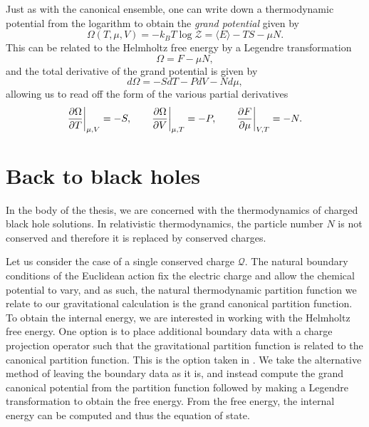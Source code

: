 Just as with the canonical ensemble, one can write down a thermodynamic potential from the logarithm to obtain the \emph{grand potential} given by
\begin{equation*}
	\Omega(T, \mu, V) = - k_B T \log \mathcal{Z} = \langle E \rangle - TS - \mu N.
\end{equation*}
This can be related to the Helmholtz free energy by a Legendre transformation
\begin{equation*}
	\Omega = F - \mu N,
\end{equation*}
and the total derivative of the grand potential is given by
\begin{equation*}
	d\Omega = - S dT - P dV - N d\mu,
\end{equation*}
allowing us to read off the form of the various partial derivatives
\begin{equation*}
	\frac{\partial \Omega}{\partial T} \bigg|_{\mu, V} = - S, \qquad \frac{\partial \Omega}{\partial V} \bigg|_{\mu, T} = - P, \qquad \frac{\partial F}{\partial \mu} \bigg|_{V, T} = -N.
\end{equation*}

\section{Back to black holes}

In the body of the thesis, we are concerned with the thermodynamics of charged black hole solutions. In relativistic thermodynamics, the particle number $N$ is not conserved and therefore it is replaced by conserved charges. 

Let us consider the case of a single conserved charge $\mathcal{Q}$. The natural boundary conditions of the Euclidean action fix the electric charge and allow the chemical potential to vary, and as such, the natural thermodynamic partition function we relate to our gravitational calculation is the grand canonical partition function. To obtain the internal energy, we are interested in working with the Helmholtz free energy. One option is to place additional boundary data with a charge projection operator \cite{Hawking:1995ap} such that the gravitational partition function is related to the canonical partition function. This is the option taken in \cite{Gibbons:1976ue, Hawking:1995ap}. We take the alternative method of leaving the boundary data as it is, and instead compute the grand canonical potential from the partition function followed by making a Legendre transformation to obtain the free energy. From the free energy, the internal energy can be computed and thus the equation of state.

